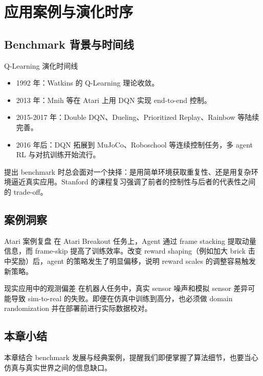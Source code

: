 \section{应用案例与演化时序}

\subsection{Benchmark 背景与时间线}

\begin{knowledgebox}{Q-Learning 演化时间线}
\begin{itemize}
    \item 1992 年：Watkins 的 Q-Learning 理论收敛。
    \item 2013 年：Mnih 等在 Atari 上用 DQN 实现 end-to-end 控制。
    \item 2015-2017 年：Double DQN、Dueling、Prioritized Replay、Rainbow 等陆续完善。
    \item 2016 年后：DQN 拓展到 MuJoCo、Roboschool 等连续控制任务，多 agent RL 与对抗训练开始流行。
\end{itemize}
\end{knowledgebox}

提出 benchmark 时总会面对一个抉择：是用简单环境获取重复性、还是用复杂环境逼近真实应用。Stanford 的课程复习强调了前者的控制性与后者的代表性之间的 trade-off。

\subsection{案例洞察}

\begin{importantbox}{Atari 案例复盘}
在 Atari Breakout 任务上，Agent 通过 frame stacking 提取动量信息，而 frame-skip 提高了训练效率。改变 reward shaping（例如加大 brick 击中奖励）后，agent 的策略发生了明显偏移，说明 reward scales 的调整容易触发新策略。
\end{importantbox}

\begin{warningbox}{现实应用中的观测偏差}
在机器人任务中，真实 sensor 噪声和模拟 sensor 差异可能导致 sim-to-real 的失败。即便在仿真中训练到高分，也必须做 domain randomization 并在部署前进行实际数据校对。
\end{warningbox}

\subsection{本章小结}

本章结合 benchmark 发展与经典案例，提醒我们即便掌握了算法细节，也要当心仿真与真实世界之间的信息缺口。

